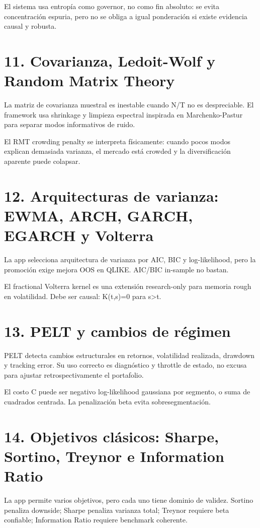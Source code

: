 \documentclass[11pt,letterpaper]{article}
\begin{document}
El sistema usa entropía como governor, no como fin absoluto: se evita concentración espuria, pero no se obliga a igual ponderación si existe evidencia causal y robusta.

\section{11. Covarianza, Ledoit-Wolf y Random Matrix Theory}
La matriz de covarianza muestral es inestable cuando N/T no es despreciable. El framework usa shrinkage y limpieza espectral inspirada en Marchenko-Pastur para separar modos informativos de ruido.

El RMT crowding penalty se interpreta físicamente: cuando pocos modos explican demasiada varianza, el mercado está crowded y la diversificación aparente puede colapsar.

\section{12. Arquitecturas de varianza: EWMA, ARCH, GARCH, EGARCH y Volterra}
La app selecciona arquitectura de varianza por AIC, BIC y log-likelihood, pero la promoción exige mejora OOS en QLIKE. AIC/BIC in-sample no bastan.

El fractional Volterra kernel es una extensión research-only para memoria rough en volatilidad. Debe ser causal: K(t,s)=0 para s>t.

\section{13. PELT y cambios de régimen}
PELT detecta cambios estructurales en retornos, volatilidad realizada, drawdown y tracking error. Su uso correcto es diagnóstico y throttle de estado, no excusa para ajustar retrospectivamente el portafolio.

El costo C puede ser negativo log-likelihood gaussiana por segmento, o suma de cuadrados centrada. La penalización beta evita sobresegmentación.

\section{14. Objetivos clásicos: Sharpe, Sortino, Treynor e Information Ratio}
La app permite varios objetivos, pero cada uno tiene dominio de validez. Sortino penaliza downside; Sharpe penaliza varianza total; Treynor requiere beta confiable; Information Ratio requiere benchmark coherente.
\end{document}
